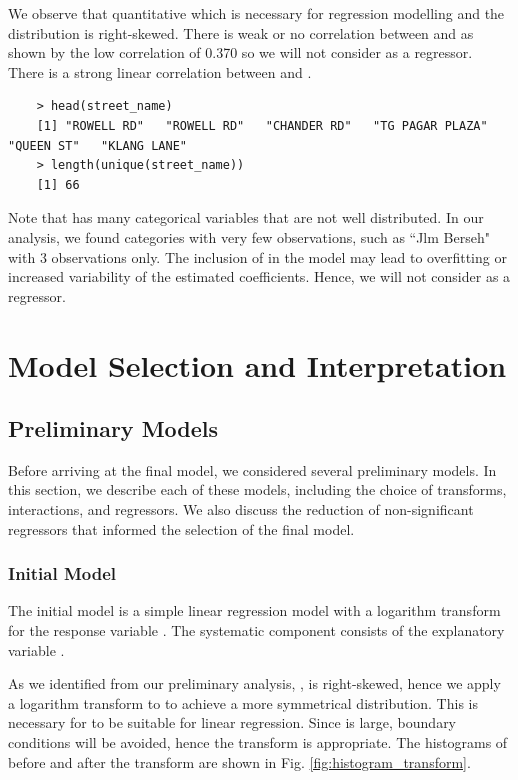 We observe that  quantitative which is necessary for regression modelling and the distribution is right-skewed. There is weak or no correlation between \newline{} and  as shown by the low correlation of 0.370 so we will not consider as a regressor. There is a strong linear correlation between  and .
\begin{verbatim}
    > head(street_name)
    [1] "ROWELL RD"   "ROWELL RD"   "CHANDER RD"   "TG PAGAR PLAZA"   "QUEEN ST"   "KLANG LANE"
    > length(unique(street_name))
    [1] 66
\end{verbatim}

Note that  has many categorical variables that are not well distributed. In our analysis, we found categories with very few observations, such as ``Jlm Berseh" with 3 observations only. The inclusion of  in the model may lead to overfitting or increased variability of the estimated coefficients. Hence, we will not consider  as a regressor.

\section{Model Selection and Interpretation}

\subsection{Preliminary Models}
Before arriving at the final model, we considered several preliminary models. In this section, we describe each of these models, including the choice of transforms, interactions, and regressors. We also discuss the reduction of non-significant regressors that informed the selection of the final model.

\subsubsection{Initial Model}
The initial model is a simple linear regression model with a logarithm transform for the response variable . The systematic component consists of the explanatory variable .

As we identified from our preliminary analysis, , is right-skewed, hence we apply a logarithm transform to  to achieve a more symmetrical distribution. This is necessary for  to be suitable for linear regression. Since  is large, boundary conditions will be avoided, hence the transform is appropriate. The histograms of  before and after the transform are shown in Fig. \ref{fig:histogram_transform}.

